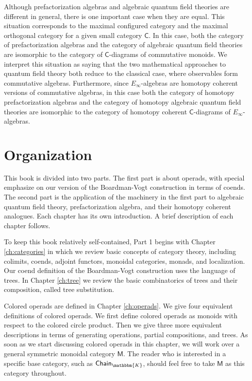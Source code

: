 \documentclass[11pt]{amsbook}
\numberwithin{section}{chapter}
\numberwithin{subsection}{section}
\numberwithin{equation}{section}
\theoremstyle{plain}
\theoremstyle{definition}
\newcommand{\fieldk}{\mathbbm{K}}
\newcommand{\C}{\mathsf{C}}
\newcommand{\M}{\mathsf{M}}
\newcommand{\Chaink}{\mathsf{Chain}_{\fieldk}}
\begin{document}
Although prefactorization algebras and algebraic quantum field theories are different in general, there is one important case when they are equal.  This situation corresponds to the maximal configured category and the maximal orthogonal category for a given small category $\C$.  In this case, both the category of prefactorization algebras and the category of algebraic quantum field theories are isomorphic to the category of $\C$-diagrams of commutative monoids.  We interpret this situation as saying that the two mathematical approaches to quantum field theory both reduce to the classical case, where observables form commutative algebras.  Furthermore, since $E_\infty$-algebras are homotopy coherent versions of commutative algebras, in this case both the category of homotopy prefactorization algebras and the category of homotopy algebraic quantum field theories are isomorphic to the category of homotopy coherent $\C$-diagrams of $E_\infty$-algebras.


\section{Organization}\label{sec:intro-organization}

This book is divided into two parts.  The first part is about operads, with special emphasize on our version of the Boardman-Vogt construction in terms of coends.  The second part is the application of the machinery in the first part to algebraic quantum field theory, prefactorization algebra, and their homotopy coherent analogues.  Each chapter has its own introduction.  A brief description of each chapter follows.

To keep this book relatively self-contained, Part 1 begins with Chapter \ref{ch:categories} in which we review basic concepts of category theory, including colimits, coends, adjoint functors, monoidal categories, monads, and localization.  Our coend definition of the Boardman-Vogt construction uses the language of trees.  In Chapter \ref{ch:tree} we review the basic combinatorics of trees and their composition, called tree substitution.

Colored operads are defined in Chapter \ref{ch:operads}.  We give four equivalent definitions of colored operads.  We first define colored operads as monoids with respect to the colored circle product.  Then we give three more equivalent descriptions in terms of generating operations, partial compositions, and trees.  As soon as we start discussing colored operads in this chapter, we will work over a general symmetric monoidal category $\M$.  The reader who is interested in a specific base category, such as $\Chaink$, should feel free to take $\M$ as this category throughout.
\end{document}
